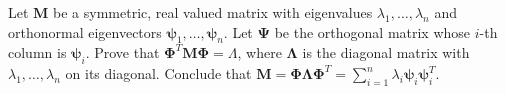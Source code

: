 \documentclass[11pt,letterpaper]{article}
\begin{document}
\begin{exercise}
  Let $\bm{M}$ be a symmetric, real valued matrix with eigenvalues $\lambda_1,\ldots,\lambda_n$ and
  orthonormal eigenvectors $\bm{\psi}_1,\ldots,\bm{\psi}_n$.
  Let $\bm{\Psi}$ be the orthogonal matrix whose $i$-th column is $\bm{\psi}_i$.
  Prove that $\bm{\Phi}^T \bm{M} \bm{\Phi} = \Lambda$,
  where $\bm{\Lambda}$ is the diagonal matrix with $\lambda_1,\ldots,\lambda_n$ on its diagonal.
  Conclude that $\bm{M}=\bm{\Phi} \bm{\Lambda} \bm{\Phi}^T = \sum_{i=1}^n \lambda_i \bm{\psi}_i\bm{\psi}_i^T$.
\end{exercise}
\end{document}
